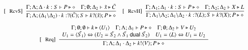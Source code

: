 \begin{figure}[!t]
\[\begin{array}{c}
		\trule{RcvS}~~\tree{
			\Gamma; \Lambda; \Delta \cat k: S \proves P \hastype \Proc
			\quad
			\Gamma; \es; \Delta_2 \proves \tilde{x} \hastype \tilde{C}
		}{
			\Gamma; \Lambda; (\Delta_1\backslash\Delta_2) \cat k: \btinp{\tilde{C}} S \vdash \binp{k}{\tilde{x}} P \hastype \Proc
		}
		\quad
		\trule{RcvH}~~\tree{
			\Gamma; \Lambda_1; \Delta_1 \cat k: S \proves P \hastype \Proc
			\quad
			\Gamma; \Lambda_2; \Delta_2 \proves X \hastype L
		}{
			\Gamma; \Lambda_1\backslash\Lambda_2; \Delta_1 \backslash \Delta_2 \cat k: \btinp{L} S \proves \binp{k}{X} P \hastype \Proc
		}
		\\[6mm]


		\trule{Req}~~\tree{
			\begin{array}{c}
				\Gamma; \es; \es \proves k \hastype \chtype{U_1} %
				\quad
				\Gamma; \Lambda; \Delta_1 \proves P \hastype \Proc
				\quad
				\Gamma; \es; \Delta_2 \proves V \hastype U_2%
				\\
				U_1 = \tilde{\chtype{S_1}} \Leftrightarrow (U_2 = \tilde{S_2} \wedge \tilde{S_1} \dualof \tilde{S_2})
				\quad
				U_1 = \chtype{L} \Leftrightarrow U_1 = U_2
			\end{array}
		}{
			\Gamma; \Lambda; \Delta_1 \cat \Delta_2 \proves \bout{k}{V} P \hastype \Proc
		}
		\\[6mm]



\end{array}\]
\end{figure}
